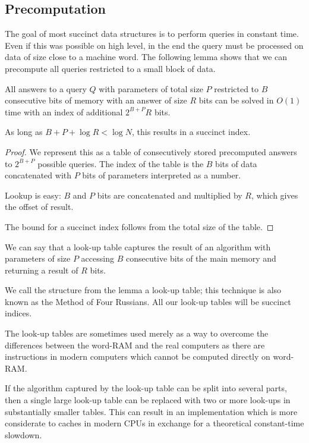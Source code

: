 \subsection{Precomputation}

The goal of most succinct data structures is to perform queries in constant time.
Even if this was possible on high level, in the end the query must be processed on data of size close to a machine word.
The following lemma shows that we can precompute all queries restricted to a small block of data.

\begin{lemma}
	All answers to a query $Q$ with parameters of total size $P$ restricted to $B$ consecutive bits of memory with an answer of size $R$ bits can be solved in $O(1)$ time with an index of additional $2^{B+P} R$ bits.
	
	As long as $B + P + \log R < \log N$, this results in a succinct index.
\end{lemma}
\begin{proof}
	We represent this as a table of consecutively stored precomputed answers to $2^{B+P}$ possible queries.
	The index of the table is the $B$ bits of data concatenated with $P$ bits of parameters interpreted as a number.

	Lookup is easy: $B$ and $P$ bits are concatenated and multiplied by $R$, which gives the offset of result.
	
	The bound for a succinct index follows from the total size of the table.
\end{proof}

We can say that a look-up table captures the result of an algorithm with parameters of size $P$ accessing $B$ consecutive bits of the main memory and returning a result of $R$ bits.

We call the structure from the lemma a look-up table; this technique is also known as the Method of Four Russians.
All our look-up tables will be succinct indices.

\bigbreak

The look-up tables are sometimes used merely as a way to overcome the differences between the word-RAM and the real computers as there are instructions in modern computers which cannot be computed directly on word-RAM.

If the algorithm captured by the look-up table can be split into several parts, then a single large look-up table can be replaced with two or more look-ups in substantially smaller tables.
This can result in an implementation which is more considerate to caches in modern CPUs in exchange for a theoretical constant-time slowdown.


